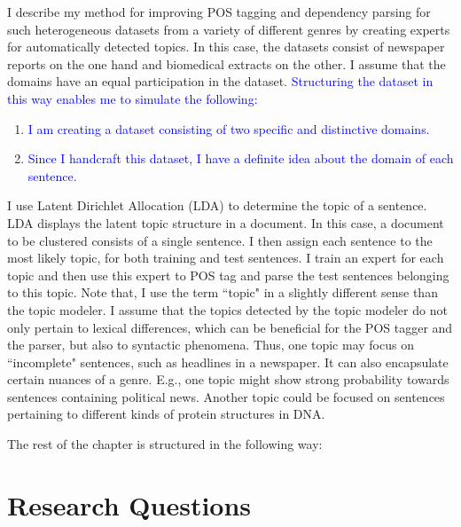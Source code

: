 I describe my method for improving POS tagging and dependency parsing for such heterogeneous datasets from a variety of different genres by creating experts for automatically detected topics. In this case, the datasets consist of newspaper reports on the one hand and biomedical extracts on the other. I assume that the domains have an equal participation in the dataset. \textcolor{blue}{Structuring the dataset in this way enables me to simulate the following:}
\begin{enumerate}
    \item  \textcolor{blue}{I am creating a dataset consisting of two specific and distinctive domains.}
    \item  \textcolor{blue}{Since I handcraft this dataset, I have a definite idea about the domain of each sentence.}
\end{enumerate}
I use Latent Dirichlet Allocation (LDA) to determine the topic of a sentence. LDA displays the latent topic structure in a document. In this case, a document to be clustered consists of a single sentence. I then assign each sentence to the most likely topic, for both training and test sentences. I train an expert for each topic and then use this expert to POS tag and parse the test sentences belonging to this topic. Note that, I use the term ``topic" in a slightly different sense than the topic modeler. I assume that the topics detected by the topic modeler do not only pertain to lexical differences, which can be beneficial for the POS tagger and the parser, but also to syntactic phenomena. Thus, one topic may focus on ``incomplete" sentences, such as headlines in a newspaper. It can also encapsulate certain nuances of a genre. E.g., one topic might show strong probability towards sentences containing political news. Another topic could be focused on sentences pertaining to different kinds of protein structures in DNA. 

The rest of the chapter is structured in the following way: 


\section{Research Questions}\label{sec:quest}

